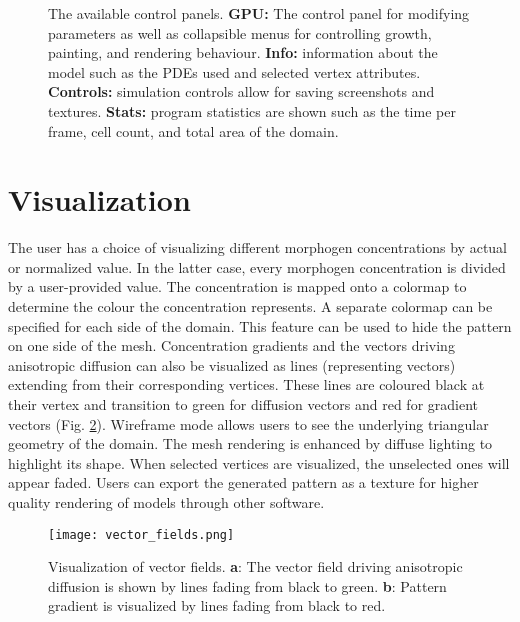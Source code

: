 \begin{figure}[p]
	\centering
	\caption{The available control panels. \textbf{GPU:} The control panel for modifying parameters as well as collapsible menus for controlling growth, painting, and rendering behaviour. \textbf{Info:} information about the model such as the PDEs used and selected vertex attributes. \textbf{Controls:} simulation controls allow for saving screenshots and textures. \textbf{Stats:} program statistics are shown such as the time per frame, cell count, and total area of the domain.} 
	\label{fig:GUIexample}
\end{figure}

\section{Visualization}
The user has a choice of visualizing different morphogen concentrations by actual or normalized value. In the latter case, every morphogen concentration is divided by a user-provided value. The concentration is mapped onto a colormap to determine the colour the concentration represents. A separate colormap can be specified for each side of the domain. This feature can be used to hide the pattern on one side of the mesh. Concentration gradients and the vectors driving anisotropic diffusion can also be visualized as lines (representing vectors) extending from their corresponding vertices. These lines are coloured black at their vertex and transition to green for diffusion vectors and red for gradient vectors (Fig. \ref{fig:vector_fields}). Wireframe mode allows users to see the underlying triangular geometry of the domain. The mesh rendering is enhanced by diffuse lighting to highlight its shape. When selected vertices are visualized, the unselected ones will appear faded. Users can export the generated pattern as a texture for higher quality rendering of models through other software.

\begin{figure}[ht]
	\centering
	\texttt{[image: vector\_fields.png]}	
	\caption{Visualization of vector fields. \textbf{a}: The vector field driving anisotropic diffusion is shown by lines fading from black to green. \textbf{b}: Pattern gradient is visualized by lines fading from black to red.} 
	\label{fig:vector_fields}
\end{figure}

